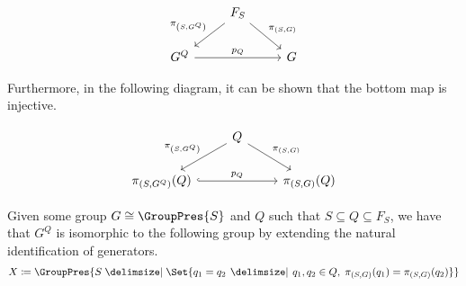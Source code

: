\begin{equation*}
	\begin{tikzcd}
		& F_S \ar[dl, "\pi_{\left(S,G^Q\right)}"'] \ar[dr, "\pi_{\left(S,G\right)}"] &
		\\ G^Q \ar[rr, "p_Q"]  & & G
	\end{tikzcd}
\end{equation*}

Furthermore, in the following diagram, it can be shown that the bottom map is injective.

\begin{equation}
	\begin{tikzcd}
		& Q \ar[dl, "\pi_{\left(S,G^Q\right)}"'] \ar[dr, "\pi_{\left(S,G\right)}"] &
		\\ \pi_{\left( S,G^Q \right)} (Q) \ar[rr, hook, "p_Q"]  & & \pi_{\left( S,G \right)}(Q)
	\end{tikzcd}
	\label{eqn:injectivity_of_P_Q_on_Q}
\end{equation}

\begin{lemma}
	\label{lem:alternative_presentation_for_G_Q}
	Given some group $G \cong \GroupPres{S}$ and $Q$ such that $S \subseteq Q \subseteq F_S$, we have that $G^Q$ is isomorphic to the following group by extending the natural identification of generators.
	\begin{equation}
		X \coloneqq \GroupPres{S \relations \Set{q_1 = q_2 \given q_1,q_2 \in Q, \; \pi_{(S,G) }(q_1) = \pi_{(S,G)}(q_2)}}
	\end{equation}
\end{lemma}

